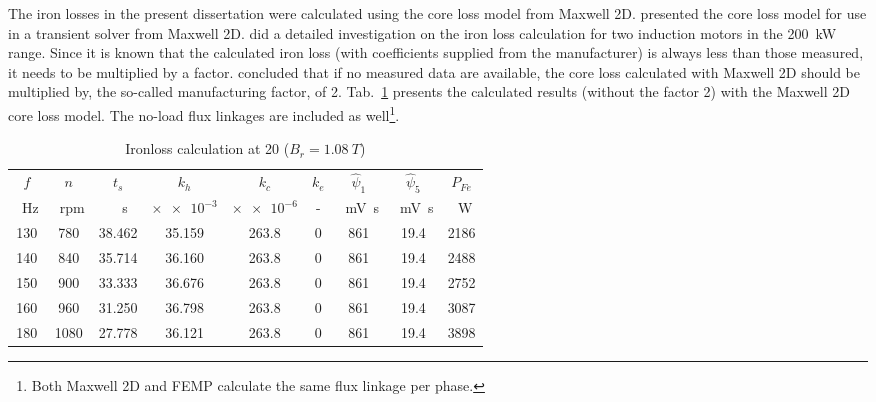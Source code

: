 The iron losses in the present dissertation were calculated using the core loss model from Maxwell 2D. \cite{lin_2004} presented the core loss model for use in a transient solver from Maxwell 2D. \cite{Germishuizen2008} did a detailed investigation on the iron loss calculation for two induction motors in the \SI{200}{kW} range. Since it is known that the calculated iron loss (with coefficients supplied from the manufacturer) is always less than those measured, it needs to be multiplied by a factor. \cite{Germishuizen2008} concluded that if no measured data are available, the core loss calculated with Maxwell 2D should be multiplied by, the so-called manufacturing factor, of 2. Tab.~\ref{tab:IronlossCalculation} presents the calculated results (without the factor 2) with the Maxwell 2D core loss model. The no-load flux linkages are included as well\footnote{Both Maxwell 2D and FEMP calculate the same flux linkage per phase.}.
\begin{table}[htbp]
	\centering		
	\caption{Ironloss calculation at \SI{20}{\degC} ($B_r=\SI{1.08}{T}$)}
	\begin{tabular}{ccccccccc}
		\toprule
		$f$            &%
		$n$            &%
		$t_s$          &%
		$k_h$          &%
		$k_c$          &%
		$k_e$          &%
		$\hat{\psi}_1$ &%
		$\hat{\psi}_5$ &%
		$P_{Fe}$%
		\\
		\SI{}{Hz}      &%
		\SI{}{rpm}     &%
		\SI{}{\mu s}   &%
		$\times \num{e-3}$    &%
		$\times \num{e-6}$    &%
		-              &%
		\SI{}{mV.s}    &%
		\SI{}{mV.s}    &%
		\SI{}{W} 
		\\\toprule
	  130  & 780  & 38.462 & 35.159 & 263.8 & 0& 861 & 19.4 &  2186 \\
	  140  & 840  & 35.714 & 36.160 & 263.8 & 0& 861 & 19.4 &  2488 \\
	  150  & 900  & 33.333 & 36.676 & 263.8 & 0& 861 & 19.4 &  2752 \\
	  160  & 960  & 31.250 & 36.798 & 263.8 & 0& 861 & 19.4 &  3087 \\
	  180  & 1080 & 27.778 & 36.121 & 263.8 & 0& 861 & 19.4 &  3898 \\
	  \bottomrule		
	\end{tabular}
	\label{tab:IronlossCalculation}
\end{table}
    
